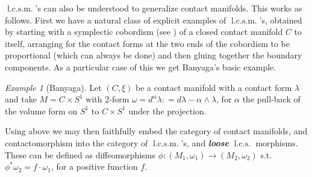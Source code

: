 \documentclass{amsart}
\numberwithin{equation}{section}
\theoremstyle{definition}
\theoremstyle{remark}
\newtheorem{example}{Example}
\DeclareMathOperator{\lcs}{l.c.s.}
\DeclareMathOperator{\lcsm}{l.c.s.m.}
\begin{document}
$\lcsm$'s can also be understood to generalize contact manifolds. This works as follows.
First we have a natural class of explicit examples of $\lcsm$'s, obtained
by starting with a symplectic cobordism (see \cite{citeEliashbergMurphyMakingcobordisms}) of a closed contact manifold
$C$ to itself, arranging for the contact forms at the two ends of the
cobordism to be proportional (which can always be done) and then
gluing together the boundary components. 
As a particular case of
this we get Banyaga's basic example.
\begin{example} [Banyaga] \label{example:banyaga} Let $(C, \xi)
   $ be a contact manifold with a contact form
   $\lambda$ and take $M=C \times S ^{1}  $ with 2-form $\omega= d
^{\alpha} 
   \lambda : = d \lambda - \alpha \wedge \lambda$, for $\alpha$ the pull-back of the
   volume form on $S ^{1} $ to $C \times S ^{1} $ under the
   projection.    %
\end{example}
Using above we may then  faithfully embed the category of contact manifolds, and contactomorphism  into the category of $\lcsm$'s, and \textbf{\emph{loose}} $\lcs$ morphisms. These can be defined as diffeomorphisms $\phi: (M _{1} , \omega _{1} ) \to (M _{2}, \omega _{2}  ) $ s.t. $\phi ^{*} \omega _{2}= f \cdot \omega _{1} $, for a positive function $f$.
\end{document}
